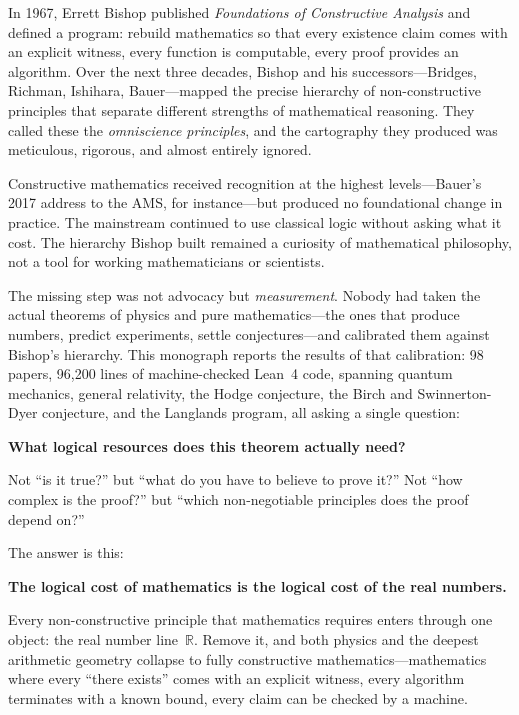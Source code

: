 \documentclass[11pt,twoside,openany]{report}
\theoremstyle{remark}
\begin{document}
In 1967, Errett Bishop published \emph{Foundations of Constructive Analysis} and defined a program: rebuild mathematics so that every existence claim comes with an explicit witness, every function is computable, every proof provides an algorithm. Over the next three decades, Bishop and his successors---Bridges, Richman, Ishihara, Bauer---mapped the precise hierarchy of non-constructive principles that separate different strengths of mathematical reasoning. They called these the \emph{omniscience principles}, and the cartography they produced was meticulous, rigorous, and almost entirely ignored.

Constructive mathematics received recognition at the highest levels---Bauer's 2017 address to the AMS, for instance---but produced no foundational change in practice. The mainstream continued to use classical logic without asking what it cost. The hierarchy Bishop built remained a curiosity of mathematical philosophy, not a tool for working mathematicians or scientists.

The missing step was not advocacy but \emph{measurement}. Nobody had taken the actual theorems of physics and pure mathematics---the ones that produce numbers, predict experiments, settle conjectures---and calibrated them against Bishop's hierarchy. This monograph reports the results of that calibration: 98 papers, 96,200 lines of machine-checked Lean~4 code, spanning quantum mechanics, general relativity, the Hodge conjecture, the Birch and Swinnerton-Dyer conjecture, and the Langlands program, all asking a single question:

\begin{thesisbox}
\textbf{What logical resources does this theorem actually need?}
\end{thesisbox}

Not ``is it true?'' but ``what do you have to believe to prove it?''
Not ``how complex is the proof?'' but ``which non-negotiable principles does the proof depend on?''

The answer is this:

\begin{thesisbox}
\textbf{The logical cost of mathematics is the logical cost of the real numbers.}
\end{thesisbox}

Every non-constructive principle that mathematics requires enters through one object: the real number line~$\mathbb{R}$. Remove it, and both physics and the deepest arithmetic geometry collapse to fully constructive mathematics---mathematics where every ``there exists'' comes with an explicit witness, every algorithm terminates with a known bound, every claim can be checked by a machine.
\end{document}
